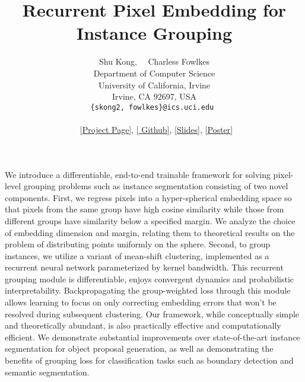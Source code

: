 \documentclass[10pt,twocolumn,letterpaper]{article}
\begin{document}
\title{Recurrent Pixel Embedding for Instance Grouping}

\author{
Shu Kong, \ \   Charless Fowlkes\\
  Department of Computer Science\\
  University of California, Irvine\\
  Irvine, CA 92697, USA \\
  \texttt{\{skong2, fowlkes\}@ics.uci.edu } \\ \\
  \ [\href{http://www.ics.uci.edu/~skong2/SMMMSG.html}{Project Page}],
[\href{https://github.com/aimerykong/Recurrent-Pixel-Embedding-for-Instance-Grouping}{
Github}],
[\href{http://www.ics.uci.edu/~skong2/slides/pixel_embedding_for_grouping_public_version.pdf}{Slides}],
[\href{http://www.ics.uci.edu/~skong2/slides/pixel_embedding_for_grouping_poster.pdf}{Poster}]
}

\maketitle

We introduce a differentiable, end-to-end trainable framework for solving
pixel-level grouping problems such as instance segmentation consisting of two
novel components. First, we regress pixels into a hyper-spherical embedding
space so that pixels from the same group have high cosine similarity while
those from different groups have similarity below a specified margin.  We
analyze the choice of embedding dimension and margin, relating them to
theoretical results on the problem of distributing points uniformly on the
sphere. Second, to group instances, we utilize a variant of mean-shift
clustering, implemented as a recurrent neural network parameterized by kernel
bandwidth.  This recurrent grouping module is differentiable, enjoys convergent
dynamics and probabilistic interpretability.  Backpropagating the
group-weighted loss through this module allows learning to focus on only
correcting embedding errors that won't be resolved during subsequent
clustering.  Our framework, while conceptually simple and theoretically
abundant, is also practically effective and computationally efficient. We
demonstrate substantial improvements over state-of-the-art instance
segmentation for object proposal generation, as well as demonstrating
the benefits of grouping loss for classification tasks such as boundary
detection and semantic segmentation.
\end{document}
